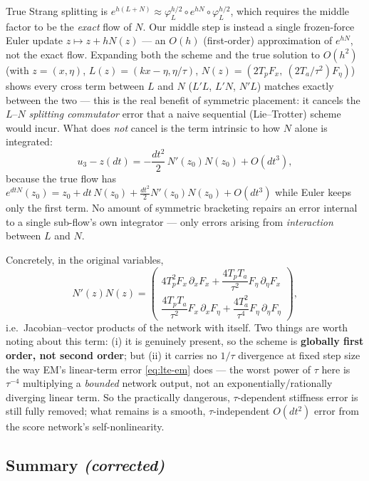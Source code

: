 \documentclass[11pt]{article}
\begin{document}
True Strang splitting is $e^{h(L+N)} \approx \varphi_L^{h/2}\circ e^{hN}\circ
\varphi_L^{h/2}$, which requires the middle factor to be the \emph{exact} flow
of $N$. Our middle step is instead a single frozen-force Euler update
$z \mapsto z + hN(z)$ — an $O(h)$ (first-order) approximation of $e^{hN}$, not
the exact flow. Expanding both the scheme and the true solution to $O(h^2)$
(with $z=(x,\eta)$, $L(z)=(kx-\eta,\eta/\tau)$,
$N(z) = (2T_pF_x,\ (2T_a/\tau^2)F_\eta)$) shows every cross term between $L$
and $N$ ($L'L$, $L'N$, $N'L$) matches exactly between the two — this is the
real benefit of symmetric placement: it cancels the $L$--$N$ \emph{splitting
commutator} error that a naive sequential (Lie--Trotter) scheme would incur.
What does \emph{not} cancel is the term intrinsic to how $N$ alone is
integrated:
\begin{equation}
u_3 - z(dt) = -\frac{dt^2}{2}\,N'(z_0)N(z_0) + O(dt^3),
\end{equation}
because the true flow has $e^{dtN}(z_0) = z_0 + dt\,N(z_0) +
\frac{dt^2}{2}N'(z_0)N(z_0) + O(dt^3)$ while Euler keeps only the first term.
No amount of symmetric bracketing repairs an error internal to a single
sub-flow's own integrator — only errors arising from \emph{interaction}
between $L$ and $N$.

Concretely, in the original variables,
\begin{equation}
N'(z)N(z) =
\begin{pmatrix}
4T_p^2 F_x\,\partial_xF_x + \dfrac{4T_pT_a}{\tau^2}F_\eta\,\partial_\eta F_x \\[8pt]
\dfrac{4T_pT_a}{\tau^2}F_x\,\partial_xF_\eta + \dfrac{4T_a^2}{\tau^4}F_\eta\,\partial_\eta F_\eta
\end{pmatrix},
\end{equation}
i.e.\ Jacobian--vector products of the network with itself. Two things are
worth noting about this term: (i) it is genuinely present, so the scheme is
\textbf{globally first order, not second order}; but (ii) it carries no
$1/\tau$ divergence at fixed step size the way EM's linear-term error
\eqref{eq:lte-em} does — the worst power of $\tau$ here is $\tau^{-4}$
multiplying a \emph{bounded} network output, not an exponentially/rationally
diverging linear term. So the practically dangerous, $\tau$-dependent
stiffness error is still fully removed; what remains is a smooth,
$\tau$-independent $O(dt^2)$ error from the score network's self-nonlinearity.

\subsection{Summary \emph{(corrected)}}
\end{document}

